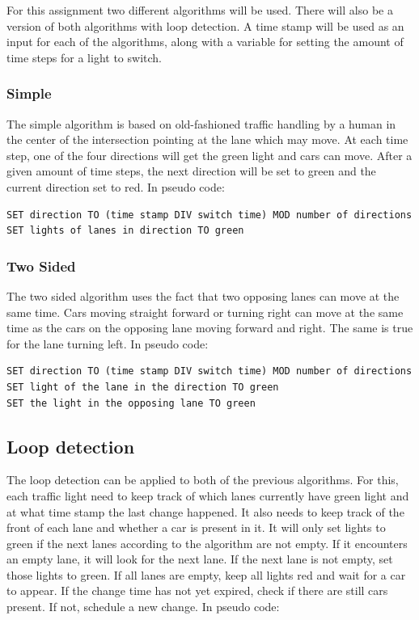 \documentclass[a4paper,11pt]{article}
\begin{document}
For this assignment two different algorithms will be used.
There will also be a version of both algorithms with loop detection.
A time stamp will be used as an input for each of the algorithms, along
with a variable for setting the amount of time steps for a light to switch.

\subsubsection*{Simple}
The simple algorithm is based on old-fashioned traffic handling by
a human in the center of the intersection pointing at the lane which may move.
At each time step, one of the four directions will get the green light and cars can move.
After a given amount of time steps, the next direction will be set to green and the current direction set to red.
In pseudo code:

\begin{lstlisting}
SET direction TO (time stamp DIV switch time) MOD number of directions
SET lights of lanes in direction TO green
\end{lstlisting}


\subsubsection*{Two Sided}
The two sided algorithm uses the fact that two opposing lanes can move at the same time.
Cars moving straight forward or turning right can move at the same time as the cars on the
opposing lane moving forward and right. The same is true for the lane turning left.
In pseudo code:

\begin{lstlisting}
SET direction TO (time stamp DIV switch time) MOD number of directions
SET light of the lane in the direction TO green
SET the light in the opposing lane TO green
\end{lstlisting}

\subsection*{Loop detection}
The loop detection can be applied to both of the previous algorithms.
For this, each traffic light need to keep track of which lanes currently have green light
and at what time stamp the last change happened.
It also needs to keep track of the front of each lane and whether a car is present in it.
It will only set lights to green if the next lanes according to the algorithm are not empty.
If it encounters an empty lane, it will look for the next lane.
If the next lane is not empty, set those lights to green.
If all lanes are empty, keep all lights red and wait for a car to appear.
If the change time has not yet expired, check if there are still cars present.
If not, schedule a new change.
In pseudo code:
\end{document}
